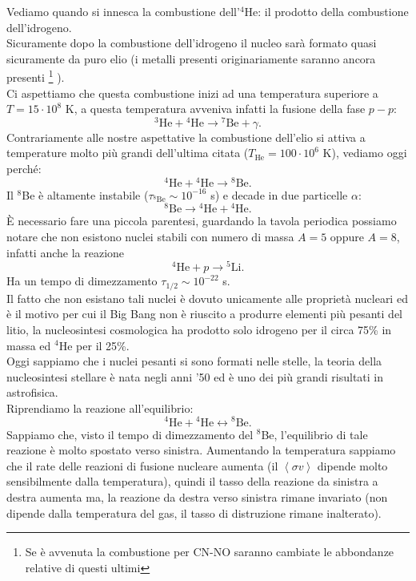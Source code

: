 Vediamo quando si innesca la combustione dell'${}^{4}$He: il prodotto della combustione dell'idrogeno. \\
Sicuramente dopo la combustione dell'idrogeno il nucleo sarà formato quasi sicuramente da puro elio (i metalli presenti originariamente saranno ancora presenti
\footnote{Se è avvenuta la combustione per CN-NO saranno cambiate le abbondanze relative di questi ultimi}
).\\
Ci aspettiamo che questa combustione inizi ad una temperatura superiore a $T = 15 \cdot 10^8$  K, a questa temperatura avveniva infatti la fusione della fase $p-p$:
\[
    {}^{3}\text{He}+{}^{4}\text{He}\to {}^{7}\text{Be} + \gamma
.\] 
Contrariamente alle nostre aspettative la combustione dell'elio si attiva a temperature molto più grandi dell'ultima citata ($T_\text{He} = 100\cdot 10^6$  K), vediamo oggi perché:
\[
    {}^{4}\text{He}+{}^{4}\text{He} \to {}^{8}\text{Be}
.\] 
Il ${}^{8}$Be è altamente instabile ($\tau_{{}^{8}\text{Be}} \sim 10^{-16}$ s) e decade in due particelle $\alpha$:
\[
    {}^{8}\text{Be} \to {}^{4}\text{He}+{}^{4}\text{He}
.\] 
È necessario fare una piccola parentesi, guardando la tavola periodica possiamo notare che non esistono nuclei stabili con numero di massa $A=5$  oppure $A=8$, infatti anche la reazione 
\[
    {}^{4}\text{He} + p \to {}^{5}\text{Li}
.\] 
Ha un tempo di dimezzamento $\tau_{1 /2} \sim 10^{-22}$ s.\\
Il fatto che non esistano tali nuclei è dovuto unicamente alle proprietà nucleari ed è il motivo per cui il Big Bang non è riuscito a produrre elementi più pesanti del litio, la nucleosintesi cosmologica ha prodotto solo idrogeno per il circa 75\% in massa ed ${}^{4}$He per il 25\%. \\
Oggi sappiamo che i nuclei pesanti si sono formati nelle stelle, la teoria della nucleosintesi stellare è nata negli anni '50 ed è uno dei più grandi risultati in astrofisica.\\
Riprendiamo la reazione all'equilibrio:
\[
    {}^{4}\text{He}+{}^{4}\text{He} \longleftrightarrow {}^{8}\text{Be}
.\] 
Sappiamo che, visto il tempo di dimezzamento del ${}^{8}$Be, l'equilibrio di tale reazione è molto spostato verso sinistra. Aumentando la temperatura sappiamo che il rate delle reazioni di fusione nucleare aumenta (il $\left<\sigma v\right>$ dipende molto sensibilmente dalla temperatura), quindi il tasso della reazione da sinistra a destra aumenta ma, la reazione da destra verso sinistra rimane invariato (non dipende dalla temperatura del gas, il tasso di distruzione rimane inalterato).
